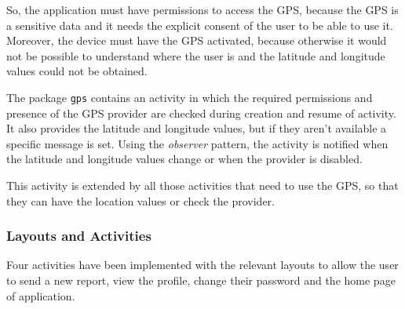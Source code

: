 \documentclass[a4paper,12pt]{report}
\begin{document}
So, the application must have permissions to access the GPS, because the GPS is a sensitive data and it needs the explicit consent of the user to be able to use it. Moreover, the device must have the GPS activated, because otherwise it would not be possible to understand where the user is and the latitude and longitude values could not be obtained.

The package \texttt{gps} contains an activity in which the required permissions and presence of the GPS provider are checked during creation and resume of activity. It also provides the latitude and longitude values, but if they aren't available a specific message is set. Using the \emph{observer} pattern, the activity is notified when the latitude and longitude values change or when the provider is disabled.

This activity is extended by all those activities that need to use the GPS, so that they can have the location values or check the provider.

\subsubsection{Layouts and Activities}
Four activities have been implemented with the relevant layouts to allow the user to send a new report, view the profile, change their password and the home page of application.
\end{document}
